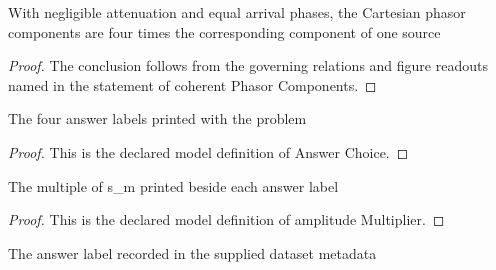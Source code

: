 \begin{lemma}
  \label{lem:physics:phyx-mini-0313:phyxminiproblems-problemphyxmini0313-coherentphasorcomponents}
  With negligible attenuation and equal arrival phases, the Cartesian phasor components are four times the corresponding component of one source
\end{lemma}
\begin{proof}
  The conclusion follows from the governing relations and figure readouts named in the statement of coherent Phasor Components.
\end{proof}
\begin{definition}
  \label{def:physics:phyx-mini-0313:phyxminiproblems-problemphyxmini0313-answerchoice}
  The four answer labels printed with the problem
\end{definition}
\begin{proof}
  This is the declared model definition of Answer Choice.
\end{proof}
\begin{definition}
  \label{def:physics:phyx-mini-0313:phyxminiproblems-problemphyxmini0313-answerchoice-amplitudemultiplier}
  The multiple of s\_m printed beside each answer label
\end{definition}
\begin{proof}
  This is the declared model definition of amplitude Multiplier.
\end{proof}
\begin{definition}
  \label{def:physics:phyx-mini-0313:phyxminiproblems-problemphyxmini0313-recordedanswerchoice}
  The answer label recorded in the supplied dataset metadata
\end{definition}
